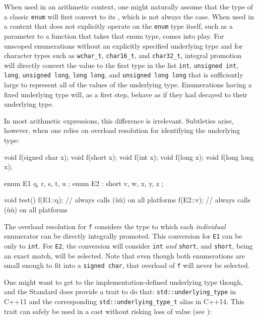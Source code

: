 When used in an arithmetic context, one might naturally assume that the
type of a classic \lstinline!enum! will first convert to its
, which is not always the case. When used in a
context that does not explicitly operate on the \lstinline!enum! type
itself, such as a parameter to a function that takes that enum type,
 comes into play. For unscoped enumerations
without an explicitly specified underlying type and for character types
such as \lstinline!wchar_t!, \lstinline!char16_t!, and \lstinline!char32_t!,
integral promotion will directly convert the value to the first type in
the list \lstinline!int!, \lstinline!unsigned!~\lstinline!int!, \lstinline!long!,
\lstinline!unsigned!~\lstinline!long!, \lstinline!long!~\lstinline!long!, and
\lstinline!unsigned!~\lstinline!long!~\lstinline!long! that is sufficiently large
to represent all of the values of the underlying type. Enumerations
having a fixed underlying type will, as a first step, behave as if they
had decayed to their underlying type.

In most arithmetic expressions, this difference is irrelevant.
Subtleties arise, however, when one relies on overload resolution for
identifying the underlying type:

\begin{emcppslisting}[emcppsbatch=e2]
void f(signed char x);
void f(short x);
void f(int x);
void f(long x);
void f(long long x);

enum E1         { q, r, s, t, u };
enum E2 : short { v, w, x, y, z };

void test()
{
   f(E1::q);  // always calls (ù{}ù) on all platforms
   f(E2::v);  // always calls (ù{}ù) on all platforms
}
\end{emcppslisting}

\noindent The overload resolution for \lstinline!f! considers the type to which each
\emph{individual} enumerator can be directly integrally promoted. This
conversion for \lstinline!E1! can be only to \lstinline!int!. For \lstinline!E2!,
the conversion will consider \lstinline!int! \emph{and} \lstinline!short!, and
\lstinline!short!, being an exact match, will be selected. Note that even
though both enumerations are small enough to fit into a
\lstinline!signed!~\lstinline!char!, that overload of \lstinline!f! will never be
selected.

One might want to get to the implementation-defined underlying type
though, and the Standard does provide a trait to do that:
\lstinline!std::underlying_type! in C++11 and the corresponding
\lstinline!std::underlying_type_t! alias in C++14. This trait can safely
be used in a cast without risking loss of value (see ):

